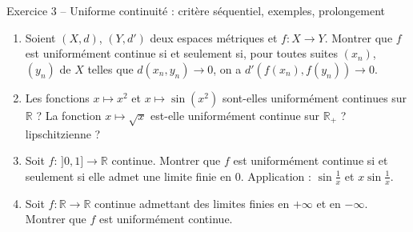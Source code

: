\documentclass[11pt,a4paper]{article}
\newcommand{\R}{\mathbb{R}}
\theoremstyle{definition}
\begin{document}
\begin{exo}{Exercice 3 -- Uniforme continuité : critère séquentiel, exemples, prolongement}
\begin{enumerate}[label=(\alph*)]
  \item Soient $(X,d)$, $(Y,d')$ deux espaces métriques et $f:X\to Y$. Montrer que $f$ est uniformément continue si et seulement si, pour toutes suites $(x_n)$, $(y_n)$ de $X$ telles que $d(x_n,y_n)\to0$, on a $d'(f(x_n),f(y_n))\to0$.
  \item Les fonctions $x\mapsto x^2$ et $x\mapsto\sin(x^2)$ sont-elles uniformément continues sur $\R$ ? La fonction $x\mapsto\sqrt x$ est-elle uniformément continue sur $\R_+$ ? lipschitzienne ?
  \item Soit $f:\,]0,1]\to\R$ continue. Montrer que $f$ est uniformément continue si et seulement si elle admet une limite finie en $0$. Application : $\sin\frac1x$ et $x\sin\frac1x$.
  \item Soit $f:\R\to\R$ continue admettant des limites finies en $+\infty$ et en $-\infty$. Montrer que $f$ est uniformément continue.
\end{enumerate}
\end{exo}
\end{document}
